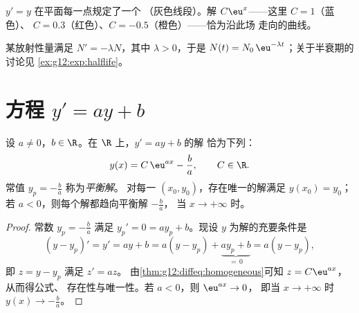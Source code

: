 \begin{omfigure}

{\small {} $y' = y$ 在平面每一点规定了一个
（灰色线段）。解 $C\eu^{x}$——这里 $C = 1$（蓝色）、
$C = 0.3$（红色）、$C = -0.5$（橙色）——恰为沿此场
走向的曲线。}
\end{omfigure}

\begin{example}[放射性衰变]\label{ex:g12:diffeq:decay}
某放射性量满足 $N' = -\lambda N$，其中 $\lambda > 0$，于是
$N(t) = N_0\,\eu^{-\lambda t}$；关于半衰期的讨论见
\cref{ex:g12:exp:halflife}。
\end{example}

\section{方程 \texorpdfstring{$y' = ay + b$}{y' = ay + b}}

\begin{theorem}[$y' = ay + b$ 的解]\label{thm:g12:diffeq:affine}
设 $a \neq 0$，$b \in \R$。在 $\R$ 上，$y' = ay + b$ 的解
恰为下列：
\[
y(x) = C\,\eu^{ax} - \frac{b}{a}, \qquad C \in \R .
\]
常值 $y_p = -\frac ba$ 称为\emph{平衡解}。
对每一 $(x_0, y_0)$，存在唯一的解满足 $y(x_0) = y_0$；若
$a < 0$，则每个解都趋向平衡解 $-\frac ba$，
当 $x \to +\infty$ 时。
\end{theorem}

\begin{proof}
常数 $y_p = -\frac{b}{a}$ 满足 $y_p' = 0 = a y_p + b$。现设 $y$
为解的充要条件是
\[
(y - y_p)' = y' = ay + b = a(y - y_p) + \underbrace{a y_p + b}_{=\,0}
= a (y - y_p),
\]
即 $z = y - y_p$ 满足 $z' = az$。
由\cref{thm:g12:diffeq:homogeneous}可知 $z = C\eu^{ax}$，从而得公式、
存在性与唯一性。若 $a < 0$，则 $\eu^{ax} \to 0$，
即当 $x \to +\infty$ 时 $y(x) \to -\frac ba$。
\end{proof}

